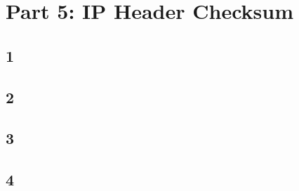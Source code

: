 \documentclass{article}
\begin{document}
    \section*{Part 5: IP Header Checksum}
    \subsection*{1}
    \subsection*{2}
    \subsection*{3}
    \subsection*{4}
\end{document}
